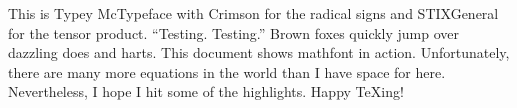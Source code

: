 \documentclass[12pt]{article}
\begin{document}
\def\footnote#1{}
\def\showabstract{0}
\let\textsf\relax
\let\ttfamily\relax
\def\documentname{Example---Typey McTypeface}



This is Typey McTypeface with Crimson for the radical signs and STIXGeneral for the tensor product. ``Testing. Testing.'' Brown foxes quickly jump over dazzling does and harts. This document shows mathfont in action. Unfortunately, there are many more equations in the world than I have space for here. Nevertheless, I hope I hit some of the highlights. Happy \TeX ing!

\let\bullet\cdot

\end{document}
